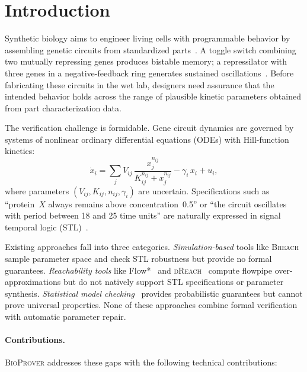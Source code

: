 \documentclass[11pt]{article}
\newcommand{\bioprover}{\textsc{BioProver}}
\newcommand{\dreach}{\textsc{dReach}}
\newcommand{\breach}{\textsc{Breach}}
\newcommand{\stl}{\textsc{STL}}
\begin{document}
\section{Introduction}
\label{sec:intro}

Synthetic biology aims to engineer living cells with programmable
behavior by assembling genetic circuits from standardized
parts~\cite{endy2005foundations}. A toggle switch combining two
mutually repressing genes produces bistable memory; a repressilator
with three genes in a negative-feedback ring generates sustained
oscillations~\cite{elowitz2000synthetic}. Before fabricating these
circuits in the wet lab, designers need assurance that the intended
behavior holds across the range of plausible kinetic parameters
obtained from part characterization data.

The verification challenge is formidable. Gene circuit dynamics are
governed by systems of nonlinear ordinary differential equations
(ODEs) with Hill-function kinetics:
\begin{equation}
\label{eq:hill}
  \dot{x}_i = \sum_j V_{ij}\,\frac{x_j^{n_{ij}}}{K_{ij}^{n_{ij}} + x_j^{n_{ij}}}
  - \gamma_i\,x_i + u_i,
\end{equation}
where parameters $(V_{ij}, K_{ij}, n_{ij}, \gamma_i)$ are uncertain.
Specifications such as ``protein~$X$ always remains above
concentration~0.5'' or ``the circuit oscillates with period between
18 and 25 time units'' are naturally expressed in signal temporal
logic (\stl{})~\cite{maler2004monitoring}.

Existing approaches fall into three categories.
\emph{Simulation-based} tools like \breach{}~\cite{donze2010breach}
sample parameter space and check \stl{} robustness but provide no
formal guarantees.
\emph{Reachability tools} like Flow*~\cite{chen2013flow} and
\dreach{}~\cite{kong2015dreach} compute flowpipe
over-approximations but do not natively support \stl{} specifications
or parameter synthesis.
\emph{Statistical model checking}~\cite{younes2006statistical}
provides probabilistic guarantees but cannot prove universal
properties. None of these approaches combine formal verification with
automatic parameter repair.

\paragraph{Contributions.}
\bioprover{} addresses these gaps with the following technical contributions:
\end{document}

